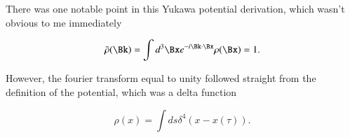 There was one notable point in this Yukawa potential derivation, which wasn't obvious to me immediately

\begin{equation}\label{eqn:relativisticElectrodynamicsT8:350}
\tilde{\rho}(\Bk) = \int d^3 \Bx e^{-i \Bk \cdot \Bx} \rho(\Bx) = 1.
\end{equation}

However, the fourier transform equal to unity followed straight from the definition of the potential, which was a delta function

\begin{equation}\label{eqn:relativisticElectrodynamicsT8:340}
\rho(x) = \int ds \delta^4(x - x(\tau)).
\end{equation}

\EndNoBibArticle
